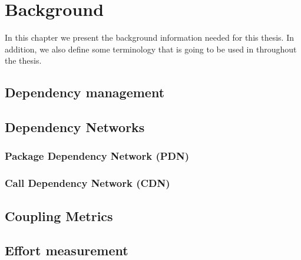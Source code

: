 \chapter{Background}\label{ch:Background}
In this chapter we present the background information needed for this thesis. In addition, we also define some terminology that is going to be used in throughout the thesis.

\section{Dependency management}

\section{Dependency Networks}
\subsection{Package Dependency Network (PDN)}
\subsection{Call Dependency Network (CDN)}

\section{Coupling Metrics}

\section{Effort measurement}

